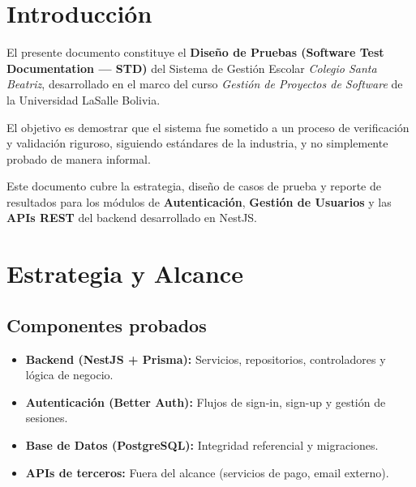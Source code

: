 \documentclass[12pt, letterpaper]{article}
\begin{document}
\newpage
\tableofcontents
\newpage

\section{Introducción}

El presente documento constituye el \textbf{Diseño de Pruebas (Software Test Documentation --- STD)}
del Sistema de Gestión Escolar \textit{Colegio Santa Beatriz}, desarrollado en el marco del curso
\textit{Gestión de Proyectos de Software} de la Universidad LaSalle Bolivia.

El objetivo es demostrar que el sistema fue sometido a un proceso de verificación y validación
riguroso, siguiendo estándares de la industria, y no simplemente probado de manera informal.

\begin{infobox}
Este documento cubre la estrategia, diseño de casos de prueba y reporte de resultados
para los módulos de \textbf{Autenticación}, \textbf{Gestión de Usuarios} y las
\textbf{APIs REST} del backend desarrollado en NestJS.
\end{infobox}

\section{Estrategia y Alcance}

\subsection{Componentes probados}

\begin{itemize}[leftmargin=1.5em, itemsep=4pt]
  \item[\faCheckCircle] \textbf{Backend (NestJS + Prisma):} Servicios, repositorios,
        controladores y lógica de negocio.
  \item[\faCheckCircle] \textbf{Autenticación (Better Auth):} Flujos de sign-in, sign-up
        y gestión de sesiones.
  \item[\faCheckCircle] \textbf{Base de Datos (PostgreSQL):} Integridad referencial
        y migraciones.
  \item[\faTimes]       \textbf{APIs de terceros:} Fuera del alcance (servicios de pago,
        email externo).
\end{itemize}
\end{document}

